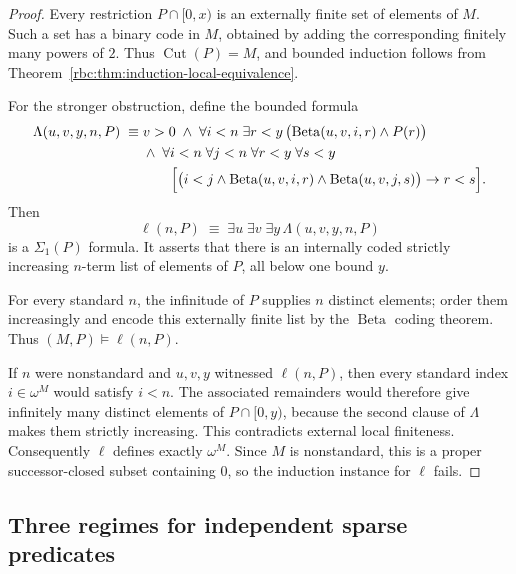 \documentclass[11pt]{article}
\numberwithin{equation}{section}
\theoremstyle{definition}
\theoremstyle{remark}
\newcommand{\std}{\omega^M}
\newcommand{\Cut}{\operatorname{Cut}}
\begin{document}
\begin{proof}
Every restriction $P\cap[0,x)$ is an externally finite set of
elements of $M$.  Such a set has a binary code in $M$, obtained by
adding the corresponding finitely many powers of $2$.
Thus $\Cut(P)=M$, and bounded induction follows from
Theorem~\ref{rbc:thm:induction-local-equivalence}.

For the stronger obstruction, define the bounded formula
\begin{align}
 \Lambda(u,v,y,n,P)\;\equiv\;&v>0
 \;\wedge\;
   \forall i<n\;\exists r<y\,
      \bigl(\operatorname{Beta}(u,v,i,r)\wedge P(r)\bigr)
      \label{rbc:eq:induction-lambda}\\
 &\wedge\;
   \forall i<n\;\forall j<n\;
   \forall r<y\;\forall s<y\,
   \nonumber\\
 &\qquad
   \Bigl[
      \bigl(i<j\wedge\operatorname{Beta}(u,v,i,r)
                    \wedge\operatorname{Beta}(u,v,j,s)\bigr)
      \rightarrow r<s
   \Bigr].\nonumber
\end{align}
Then
\begin{equation}
 \ell(n,P)\;\equiv\;
       \exists u\;\exists v\;\exists y\,
                  \Lambda(u,v,y,n,P)
 \label{rbc:eq:induction-list}
\end{equation}
is a $\Sigma_1(P)$ formula.  It asserts that there is an internally
coded strictly increasing $n$-term list of elements of $P$, all below
one bound $y$.

For every standard $n$, the infinitude of $P$ supplies $n$ distinct
elements; order them increasingly and encode this externally finite
list by the $\operatorname{Beta}$ coding theorem.  Thus
$(M,P)\models\ell(n,P)$.

If $n$ were nonstandard and $u,v,y$ witnessed $\ell(n,P)$, then
every standard index $i\in\std$ would satisfy $i<n$.  The associated
remainders would therefore give infinitely many distinct elements of
$P\cap[0,y)$, because the second clause of $\Lambda$ makes them
strictly increasing.  This contradicts external local finiteness.
Consequently $\ell$ defines exactly $\std$.  Since $M$ is
nonstandard, this is a proper successor-closed subset containing
$0$, so the induction instance for $\ell$ fails.
\end{proof}

\subsection{Three regimes for independent sparse predicates}
\end{document}
